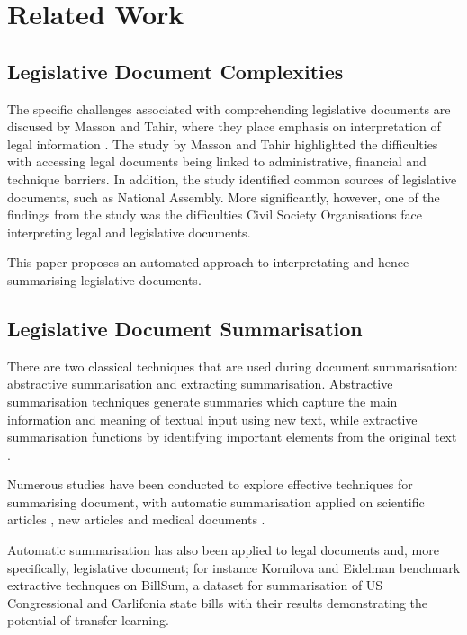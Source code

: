 \documentclass[conference]{IEEEtran}
\begin{document}
\section{Related Work}
\label{sec:related_work}

\subsection{Legislative Document Complexities}
\label{sec:related_work:challenges}

The specific challenges associated with comprehending legislative documents are discused by Masson and Tahir, where they place emphasis on interpretation of legal information \cite{Masson2016Legal}. The study by Masson and Tahir highlighted the difficulties with accessing legal documents being linked to administrative, financial and technique barriers. In addition, the study identified common sources of legislative documents, such as National Assembly. More significantly, however, one of the findings from the study was the difficulties Civil Society Organisations face interpreting legal and legislative documents.

This paper proposes an automated approach to interpretating and hence summarising legislative documents.

\subsection{Legislative Document Summarisation}
\label{sec:related_work:summarisation_techniques}
There are two classical techniques that are used during document summarisation: abstractive summarisation and extracting summarisation. Abstractive summarisation techniques generate summaries which capture the main information and meaning of textual input using new text, while extractive summarisation functions by identifying important elements from the original text \cite{Mehta2016Extractive}.

Numerous studies have been conducted to explore effective techniques for summarising document, with automatic summarisation applied on scientific articles \cite{Altmami2022Automatic}, new articles \cite{Oliveira2024Assessing} and medical documents \cite{Sarker2012Extractive}.

Automatic summarisation has also been applied to legal documents \cite{Hachey2006Extractive} and, more specifically, legislative document; for instance Kornilova and Eidelman \cite{Kornilova2019Billsum} benchmark extractive technques on BillSum, a dataset for summarisation of US Congressional and Carlifonia state bills with their results demonstrating the potential of transfer learning.
\end{document}
